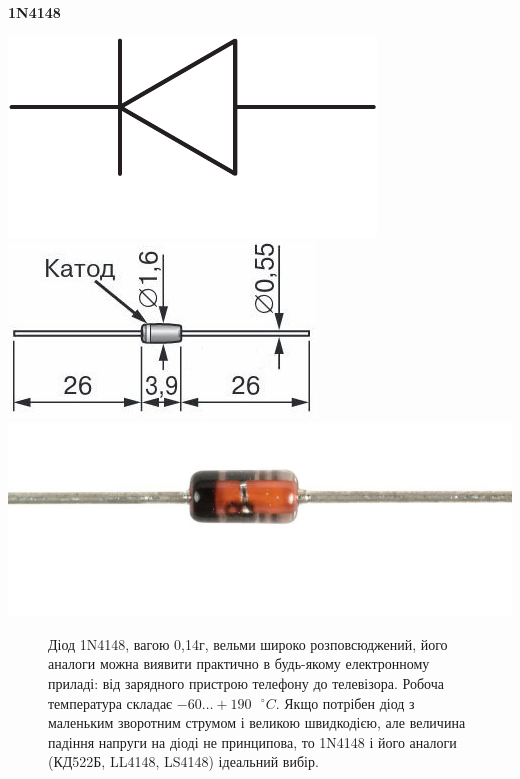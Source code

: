 \documentclass[a4paper,14pt]{extreport}
\begin{document}
  \newpage
  \begin{tcolorbox}[colback=white!100,colframe=red!75!black,width=19cm,righttitle=0.5cm,subtitle style={boxrule=0.4pt, colback=yellow!50!red!25!white},title= \bf{Графічне позначення}\hfill  \bf{Натуральне зоображення}]
  	\begin{center}\bf{1N4148}\end{center}
  	\tcblower
  	\includegraphics[scale=0.5]{1.1.pdf}\hfill \includegraphics[scale=0.8]{1.2.15.jpg} \hfill\includegraphics[scale=0.2]{1.2.16.jpg}
  \end{tcolorbox}
  \begin{figure}
  \vspace{-0.7 cm}
  \parbox{12cm}{%
    \begin{tcolorbox}[width=12cm,right=0.5cm]
    Діод 1N4148, вагою 0,14г, вельми широко розповсюджений, його аналоги можна виявити практично в будь-якому електронному приладі: від зарядного пристрою телефону до телевізора. Робоча температура складає $-60\ldots+190 \text{ }^{ \circ}C$. Якщо потрібен діод з маленьким зворотним струмом і великою швидкодією, але величина падіння напруги на діоді не принципова, то 1N4148 і його аналоги (КД522Б, LL4148, LS4148) ідеальний вибір.
    \end{tcolorbox}}
  \end{figure}
\end{document}
